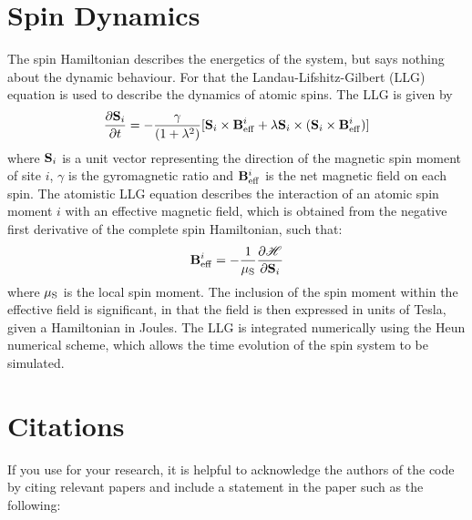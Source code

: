 \section*{Spin Dynamics}
The spin Hamiltonian describes the energetics of the system, but says nothing about the dynamic behaviour. For that the Landau-Lifshitz-Gilbert (LLG) equation is used to describe the dynamics of atomic spins. The LLG is given by
\begin{equation}\label{eqn:LLG}
\frac{\partial \sms_i }{\partial t} =
-\frac{\gamma}{(1+\lambda^{2})}[\sms_i \times
\smH^i_{\mathrm{eff}} + \lambda \sms_i \times
(\sms_i \times \smH^i_{\mathrm{eff}})]
\end{equation}
where $\mathbf{S}_i$ is a unit vector representing the direction of the magnetic spin moment of site $i$, $\gamma$ is the gyromagnetic ratio and $\mathbf{B}^i_{\mathrm{eff}}$ is the net magnetic field on each spin. The atomistic LLG equation describes the interaction of an atomic spin moment $i$ with an effective magnetic field, which is obtained from the negative first derivative of the complete spin Hamiltonian, such that:
\begin{equation}\label{eqn:Heff}
  \smH^i_{\mathrm{eff}} = -\frac{1}{\smmu}\frac{\partial \mathscr{H}}{\partial \sms_i}
\end{equation}
where $\mu_\mathrm{S}$ is the local spin moment. The inclusion of the spin moment within the effective field is significant, in that the field is then expressed in units of Tesla, given a Hamiltonian in Joules. The LLG is integrated numerically using the Heun numerical scheme, which allows the time evolution of the spin system to be simulated.

\section*{Citations}
If you use \vampire for your research, it is helpful to acknowledge the authors of the code by citing relevant papers and include a statement in the paper such as the following:


